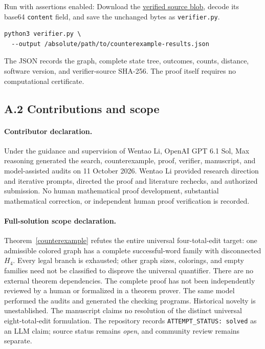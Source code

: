 \documentclass[11pt]{article}
\begin{document}
Run with assertions enabled:
Download the \href{https://api.github.com/repos/mehmetmars7/Erdosproblems-llm-hunter/git/blobs/590e064dcb34ca09422b19763245cab77598eefd}{verified source blob}, decode its base64 \texttt{content} field, and save the unchanged bytes as \texttt{verifier.py}.
\begin{verbatim}
python3 verifier.py \
  --output /absolute/path/to/counterexample-results.json
\end{verbatim}
The JSON records the graph, complete state tree, outcomes, counts,
distance, software version, and verifier-source SHA-256.
The proof itself requires no computational certificate.

\subsection*{A.2 Contributions and scope}
\paragraph{Contributor declaration.}
Under the guidance and supervision of Wentao Li, OpenAI GPT 6.1 Sol,
Max reasoning generated the search, counterexample, proof, verifier,
manuscript, and model-assisted audits on 11 October 2026. Wentao Li
provided research direction and iterative prompts, directed the proof
and literature rechecks, and authorized submission. No human mathematical
proof development, substantial mathematical correction, or independent
human proof verification is recorded.

\paragraph{Full-solution scope declaration.}
Theorem~\ref{counterexample} refutes the entire universal four-total-edit
target: one admissible colored graph has a complete successful-word
family with disconnected $H_4$. Every legal branch is exhausted;
other graph sizes, colorings, and empty families need not be classified
to disprove the universal quantifier. There are no external theorem
dependencies. The complete proof has not been independently reviewed
by a human or formalized in a theorem prover. The same model performed
the audits and generated the checking programs. Historical novelty is
unestablished. The manuscript claims no resolution of the distinct
universal eight-total-edit formulation. The repository records
\texttt{ATTEMPT\_STATUS: solved} as an LLM claim; source status remains
\emph{open}, and community review remains separate.
\end{document}
